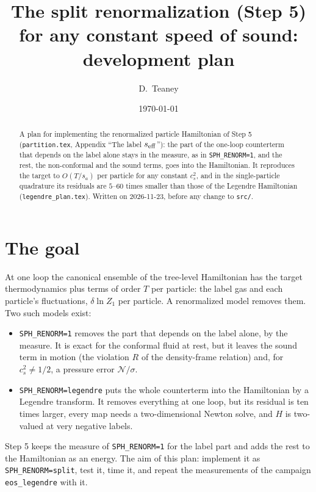\documentclass[11pt,aps,preprint,nofootinbib,superscriptaddress,tightenlines]{revtex4-2}
\begin{document}
\sloppy

\title{The split renormalization (Step 5) for any constant speed of sound:\\ development plan}
\author{D.~Teaney}
\date{\today}

\begin{abstract}
A plan for implementing the renormalized particle Hamiltonian of Step 5 (\nolinkurl{partition.tex}, Appendix ``The label $s_{\rm eff}$''): the part of the
one-loop counterterm that depends on the label alone stays in the measure, as in \texttt{SPH\_RENORM=1}, and the rest, the non-conformal and the sound terms, goes
into the Hamiltonian.  It reproduces the target to $O(T/s_a)$ per particle for any constant $c_s^2$, and in the single-particle quadrature its residuals are $5$--$60$
times smaller than those of the Legendre Hamiltonian (\nolinkurl{legendre_plan.tex}).  Written on 2026-11-23, before any change to \texttt{src/}.
\end{abstract}

\maketitle
\tableofcontents

\section{The goal}
\label{sec:goal}

At one loop the canonical ensemble of the tree-level Hamiltonian has the target thermodynamics plus terms of order $T$ per particle: the label gas and each
particle's fluctuations, $\delta\ln Z_1$ per particle.  A renormalized model removes them.  Two such models exist:
\begin{itemize}
\item \texttt{SPH\_RENORM=1} removes the part that depends on the label alone, by the measure.  It is exact for the conformal fluid at rest, but it leaves the
  sound term in motion (the violation $R$ of the density-frame relation) and, for $c_s^2\neq1/2$, a pressure error $\mathcal N/\sigma$.
\item \texttt{SPH\_RENORM=legendre} puts the whole counterterm into the Hamiltonian by a Legendre transform.  It removes everything at one loop, but its
  residual is ten times larger, every map needs a two-dimensional Newton solve, and $H$ is two-valued at very negative labels.
\end{itemize}
Step 5 keeps the measure of \texttt{SPH\_RENORM=1} for the label part and adds the rest to the Hamiltonian as an energy.  The aim of this plan: implement it as
\texttt{SPH\_RENORM=split}, test it, time it, and repeat the measurements of the campaign \texttt{eos\_legendre} with it.
\end{document}
